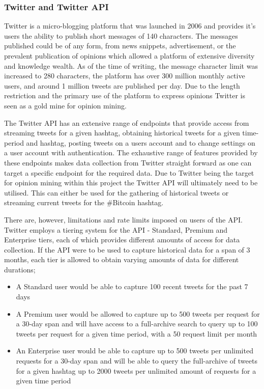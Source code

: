 \documentclass[oneside, 12pt]{article}
\begin{document}
			\subsubsection{Twitter and Twitter API}
			Twitter is a micro-blogging platform that was launched in 2006 and provides it's users the ability to publish short messages of 140 characters. The messages published could be of any form, from news snippets, advertisement, or the prevalent publication of opinions which allowed a platform of extensive diversity and knowledge wealth. As of the time of writing, the message character limit was increased to 280 characters, the platform has over 300 million monthly active users, and around 1 million tweets are published per day. Due to the length restriction and the primary use of the platform to express opinions Twitter is seen as a gold mine for opinion mining.
			
			The Twitter API has an extensive range of endpoints that provide access from streaming tweets for a given hashtag, obtaining historical tweets for a given time-period and hashtag, posting tweets on a users account and to change settings on a user account with authentication. The exhaustive range of features provided by these endpoints makes data collection from Twitter straight forward as one can target a specific endpoint for the required data. Due to Twitter being the target for opinion mining within this project the Twitter API will ultimately need to be utilised. This can either be used for the gathering of historical tweets or streaming current tweets for the \#Bitcoin hashtag.
			
			There are, however, limitations and rate limits imposed on users of the API. Twitter employs a tiering system for the API - Standard, Premium and Enterprise tiers, each of which provides different amounts of access for data collection. If the API were to be used to capture historical data for a span of 3 months, each tier is allowed to obtain varying amounts of data for different durations; \cite{SearchTweets}
			
			\begin{itemize}
				\item A Standard user would be able to capture 100 recent tweets for the past 7 days
				\item A Premium user would be allowed to capture up to 500 tweets per request for a 30-day span and will have access to a full-archive search to query up to 100 tweets per request for a given time period, with a 50 request limit per month
				\item An Enterprise user would be able to capture up to 500 tweets per unlimited requests for a 30-day span and will be able to query the full-archive of tweets for a given hashtag up to 2000 tweets per unlimited amount of requests for a given time period
			\end{itemize}
		
\end{document}

